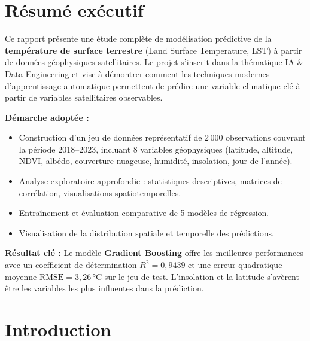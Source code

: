 \documentclass[a4paper,12pt]{report}
\begin{document}
\tableofcontents
\listoffigures
\listoftables
\newpage

\chapter*{R\'esum\'e ex\'ecutif}

Ce rapport pr\'esente une \'etude compl\`ete de mod\'elisation pr\'edictive de la \textbf{temp\'erature de surface terrestre} (Land Surface Temperature, LST) \`a partir de donn\'ees g\'eophysiques satellitaires. Le projet s'inscrit dans la th\'ematique IA \& Data Engineering et vise \`a d\'emontrer comment les techniques modernes d'apprentissage automatique permettent de pr\'edire une variable climatique cl\'e \`a partir de variables satellitaires observables.

\bigskip
\noindent\textbf{D\'emarche adopt\'ee :}
\begin{itemize}[leftmargin=2em]
  \item Construction d'un jeu de donn\'ees repr\'esentatif de 2\,000 observations couvrant la p\'eriode 2018--2023, incluant 8 variables g\'eophysiques (latitude, altitude, NDVI, alb\'edo, couverture nuageuse, humidit\'e, insolation, jour de l'ann\'ee).
  \item Analyse exploratoire approfondie : statistiques descriptives, matrices de corr\'elation, visualisations spatiotemporelles.
  \item Entra\^inement et \'evaluation comparative de 5 mod\`eles de r\'egression.
  \item Visualisation de la distribution spatiale et temporelle des pr\'edictions.
\end{itemize}

\bigskip
\noindent\textbf{R\'esultat cl\'e :} Le mod\`ele \textbf{Gradient Boosting} offre les meilleures performances avec un coefficient de d\'etermination $R^2 = 0{,}9439$ et une erreur quadratique moyenne $\text{RMSE} = 3{,}26$\,°C sur le jeu de test. L'insolation et la latitude s'av\`erent \^etre les variables les plus influentes dans la pr\'ediction.

\newpage

\chapter{Introduction}
\end{document}
